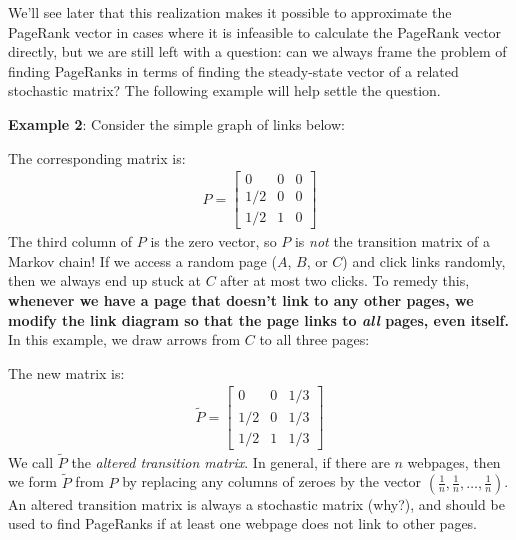 \documentclass{article}
\begin{document}
We'll see later that this realization makes it possible to approximate the PageRank vector in cases where it is infeasible to calculate the PageRank vector directly, but we are still left with a question: can we always frame the problem of finding PageRanks in terms of finding the steady-state vector of a related stochastic matrix? The following example will help settle the question.

\textbf{Example 2}: Consider the simple graph of links below:

\begin{center}
\end{center}

The corresponding matrix is:
\begin{align*}
  P = \begin{bmatrix}
        0   & 0 & 0 \\
        1/2 & 0 & 0 \\
        1/2 & 1 & 0
      \end{bmatrix}
\end{align*}
The third column of $P$ is the zero vector, so $P$ is \emph{not} the transition matrix of a Markov chain! If we access a random page ($A$, $B$, or $C$) and click links randomly, then we always end up stuck at $C$ after at most two clicks. To remedy this, \textbf{whenever we have a page that doesn't link to any other pages, we modify the link diagram so that the page links to \emph{all} pages, even itself.} In this example, we draw arrows from $C$ to all three pages:

\begin{center}
\end{center}

The new matrix is:
\begin{align*}
  \widetilde{P} = \begin{bmatrix}
                    0   & 0 & 1/3 \\
                    1/2 & 0 & 1/3 \\
                    1/2 & 1 & 1/3
                  \end{bmatrix}
\end{align*}
We call $\widetilde{P}$ the \emph{altered transition matrix}. In general, if there are $n$ webpages, then we form $\widetilde{P}$ from $P$ by replacing any columns of zeroes by the vector $(\frac{1}{n}, \frac{1}{n}, \ldots, \frac{1}{n})$. An altered transition matrix is always a stochastic matrix (why?), and should be used to find PageRanks if at least one webpage does not link to other pages.
\end{document}
